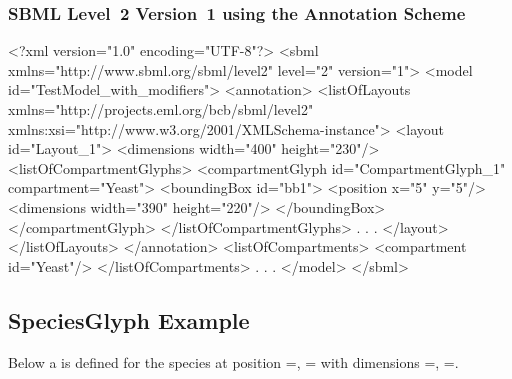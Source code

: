 \subsubsection{SBML Level~2 Version~1 using the Annotation Scheme}
\begin{example}
<?xml version="1.0" encoding="UTF-8"?>
<sbml xmlns="http://www.sbml.org/sbml/level2" level="2" version="1">
  <model id="TestModel_with_modifiers">
    <annotation>
     <listOfLayouts xmlns="http://projects.eml.org/bcb/sbml/level2"
              xmlns:xsi="http://www.w3.org/2001/XMLSchema-instance">
      <layout id="Layout_1">
        <dimensions width="400" height="230"/>
        <listOfCompartmentGlyphs>
          <compartmentGlyph id="CompartmentGlyph_1" compartment="Yeast">
            <boundingBox id="bb1">
              <position x="5" y="5"/>
              <dimensions width="390" height="220"/>
            </boundingBox>
          </compartmentGlyph>
        </listOfCompartmentGlyphs>
                .
                .
                .
      </layout>
     </listOfLayouts>
    </annotation>
    <listOfCompartments>
      <compartment id="Yeast"/>
    </listOfCompartments>
        .
        .
        .
  </model> 
</sbml>
\end{example}

\subsection{SpeciesGlyph Example}
Below a \SpeciesGlyph is defined for the species  at 
position =, = with dimensions
=, =. 

\label{example:speciesglyph}
